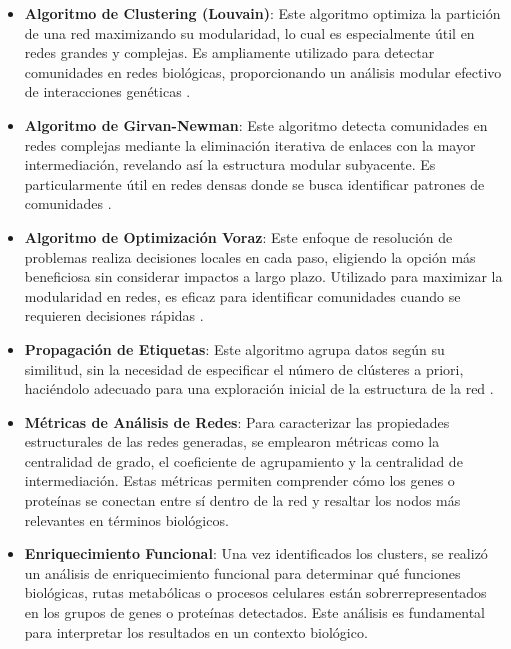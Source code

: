 \begin{itemize}
	\item \textbf{Algoritmo de Clustering (Louvain)}: Este algoritmo optimiza la partición de una red maximizando su modularidad, lo cual es especialmente útil en redes grandes y complejas. Es ampliamente utilizado para detectar comunidades en redes biológicas, proporcionando un análisis modular efectivo de interacciones genéticas \cite{Blondel2008}.
	
	\item \textbf{Algoritmo de Girvan-Newman}: Este algoritmo detecta comunidades en redes complejas mediante la eliminación iterativa de enlaces con la mayor intermediación, revelando así la estructura modular subyacente. Es particularmente útil en redes densas donde se busca identificar patrones de comunidades \cite{Girvan2002}.
	
	\item \textbf{Algoritmo de Optimización Voraz}: Este enfoque de resolución de problemas realiza decisiones locales en cada paso, eligiendo la opción más beneficiosa sin considerar impactos a largo plazo. Utilizado para maximizar la modularidad en redes, es eficaz para identificar comunidades cuando se requieren decisiones rápidas \cite{Fortunato2010}.
	
	\item \textbf{Propagación de Etiquetas}: Este algoritmo agrupa datos según su similitud, sin la necesidad de especificar el número de clústeres a priori, haciéndolo adecuado para una exploración inicial de la estructura de la red \cite{Raghavan2007}.
	
	\item \textbf{Métricas de Análisis de Redes}: Para caracterizar las propiedades estructurales de las redes generadas, se emplearon métricas como la centralidad de grado, el coeficiente de agrupamiento y la centralidad de intermediación. Estas métricas permiten comprender cómo los genes o proteínas se conectan entre sí dentro de la red y resaltar los nodos más relevantes en términos biológicos.
	
	\item \textbf{Enriquecimiento Funcional}: Una vez identificados los clusters, se realizó un análisis de enriquecimiento funcional para determinar qué funciones biológicas, rutas metabólicas o procesos celulares están sobrerrepresentados en los grupos de genes o proteínas detectados. Este análisis es fundamental para interpretar los resultados en un contexto biológico.
\end{itemize}



